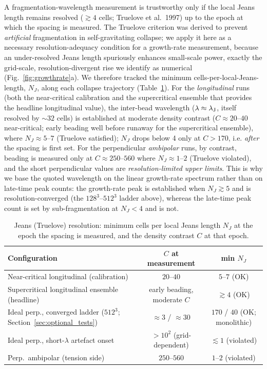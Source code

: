 \documentclass[usenatbib,twoside,twocolumn]{mnras}
\begin{document}
A fragmentation-wavelength measurement is trustworthy only if the local Jeans length remains resolved ($\gtrsim4$ cells; Truelove et al.\ 1997) up to the epoch at which the spacing is measured. The Truelove criterion was derived to prevent \emph{artificial} fragmentation in self-gravitating collapse; we apply it here as a necessary resolution-adequacy condition for a growth-rate measurement, because an under-resolved Jeans length spuriously enhances small-scale power, exactly the grid-scale, resolution-divergent rise we identify as numerical (Fig.~\ref{fig:growthrate}a). We therefore tracked the minimum cells-per-local-Jeans-length, $N_J$, along each collapse trajectory (Table~\ref{tab:truelove}). For the \emph{longitudinal} runs (both the near-critical calibration and the supercritical ensemble that provides the headline longitudinal value), the inter-bead wavelength ($\lambda\approx\lambda_{\rm J}$, itself resolved by $\sim32$ cells) is established at moderate density contrast ($C\approx20$--$40$ near-critical; early beading well before runaway for the supercritical ensemble), where $N_J\approx5$--$7$ (Truelove satisfied); $N_J$ drops below 4 only at $C>170$, i.e. \emph{after} the spacing is first set. For the perpendicular \emph{ambipolar} runs, by contrast, beading is measured only at $C\approx250$--$560$ where $N_J\approx1$--$2$ (Truelove violated), and the short perpendicular values are \emph{resolution-limited upper limits}. This is why we base the quoted wavelength on the linear growth-rate spectrum rather than on late-time peak counts: the growth-rate peak is established when $N_J\gtrsim5$ and is resolution-converged (the $128^3$--$512^3$ ladder above), whereas the late-time peak count is set by sub-fragmentation at $N_J<4$ and is not.

\begin{table}
\caption{Jeans (Truelove) resolution: minimum cells per local Jeans length $N_J$ at the epoch the spacing is measured, and the density contrast $C$ at that epoch.}
\label{tab:truelove}
\footnotesize
\setlength{\tabcolsep}{4pt}
\begin{tabular}{p{3.6cm}cc}
\toprule
Configuration & $C$ at measurement & min $N_J$ \\
\midrule
Near-critical longitudinal (calibration) & $20$--$40$ & $5$--$7$ (OK) \\
Supercritical longitudinal ensemble (headline) & early beading, moderate $C$ & $\gtrsim4$ (OK) \\
Ideal perp., converged ladder ($512^3$; Section~\ref{sec:optional_tests}) & $\approx3$ / $\approx30$ & $170$ / $40$ (OK; monolithic) \\
Ideal perp., short-$\lambda$ artefact onset & $>10^2$ (grid-dependent) & $\lesssim1$ (violated) \\
Perp.\ ambipolar (tension side) & $250$--$560$ & $1$--$2$ (violated) \\
\bottomrule
\end{tabular}
\end{table}
\end{document}
